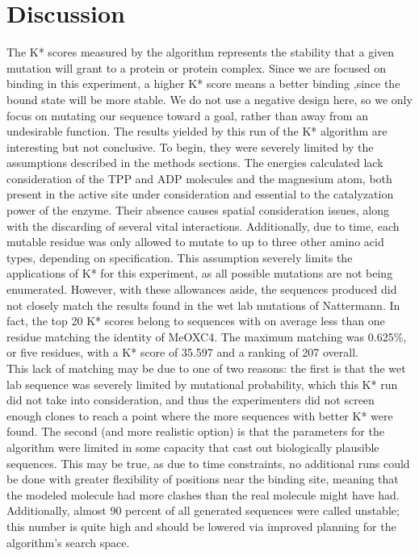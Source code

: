 \documentclass[12pt]{extarticle}
\begin{document}
\section{Discussion}
The K* scores measured by the algorithm represents the stability that a given mutation will grant to a protein or protein complex. Since we are focused on binding in this experiment, a higher K* score means a better binding ,since the bound state will be more stable. We do not use a negative design here, so we only focus on mutating our sequence toward a goal, rather than away from an undesirable function. The results yielded by this run of the K* algorithm are interesting but not conclusive. To begin, they were severely limited by the assumptions described in the methods sections. The energies calculated lack consideration of the TPP and ADP molecules and the magnesium atom, both present in the active site under consideration and essential to the catalyzation power of the enzyme. Their absence causes spatial consideration issues, along with the discarding of several vital interactions. Additionally, due to time, each mutable residue was only allowed to mutate to up to three other amino acid types, depending on specification. This assumption severely limits the applications of K* for this experiment, as all possible mutations are not being enumerated.
However, with these allowances aside, the sequences produced did not closely match the results found in the wet lab mutations of {Nattermann}. In fact, the top 20 K* scores belong to sequences with on average less than one residue matching the identity of MeOXC4. The maximum matching was 0.625\%, or five residues, with a K* score of 35.597 and a ranking of 207 overall. \\
\indent This lack of matching may be due to one of two reasons: the first is that the wet lab sequence was severely limited by mutational probability, which this K* run did not take into consideration, and thus the experimenters did not screen enough clones to reach a point where the more sequences with better K* were found. The second (and more realistic option) is that the parameters for the algorithm were limited in some capacity that cast out biologically plausible sequences. This may be true, as due to time constraints, no additional runs could be done with greater flexibility of positions near the binding site, meaning that the modeled molecule had more clashes than the real molecule might have had. Additionally, almost 90 percent of all generated sequences were called unstable; this number is quite high and should be lowered via improved planning for the algorithm's search space.\\
\end{document}
